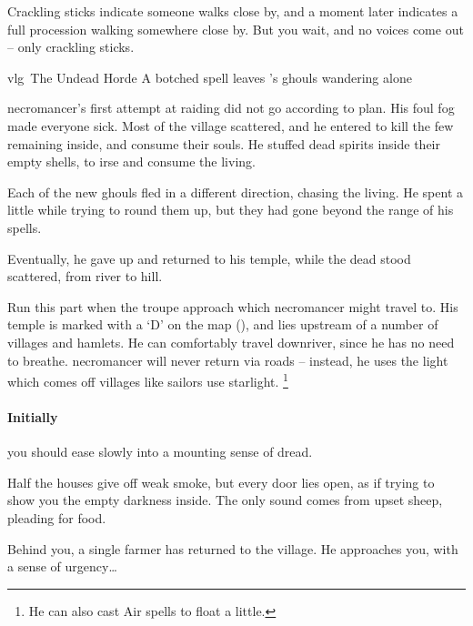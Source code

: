 \begin{boxtext}
  Crackling sticks indicate someone walks close by, and a moment later indicates a full procession walking somewhere close by.
  But you wait, and no voices come out -- only crackling sticks.
\end{boxtext}

{\gls{vlg}~The Undead Horde}%
{A botched spell leaves 's ghouls wandering alone}%

\begin{exampletext}
  \Gls{necromancer}'s first attempt at raiding  did not go according to plan.
  His foul fog made everyone sick.
  Most of the \gls{village} scattered, and he entered to kill the few remaining inside, and consume their souls.
  He stuffed dead spirits inside their empty shells, to irse and consume the living.

  Each of the new ghouls fled in a different direction, chasing the living.
  He spent a little while trying to round them up, but they had gone beyond the range of his spells.

  Eventually, he gave up and returned to his temple, while the dead stood scattered, from river to hill.
\end{exampletext}

Run this part when the troupe approach  which \gls{necromancer} might travel to.
His temple is marked with a `\gls{D}' on the map (), and lies upstream of a number of \glspl{village} and hamlets.
He can comfortably travel downriver, since he has no need to breathe.%
\Gls{necromancer} will never return via roads -- instead, he uses the light which comes off \glspl{village} like sailors use starlight.
\footnote{He can also cast Air spells to float a little.}

\paragraph{Initially}
you should ease slowly into a mounting sense of dread.

\begin{boxtext}
  Half the houses give off weak smoke, but every door lies open, as if trying to show you the empty darkness inside.
  The only sound comes from upset sheep, pleading for food.

  Behind you, a single farmer has returned to the \gls{village}.
  He approaches you, with a sense of urgency\ldots
\end{boxtext}

